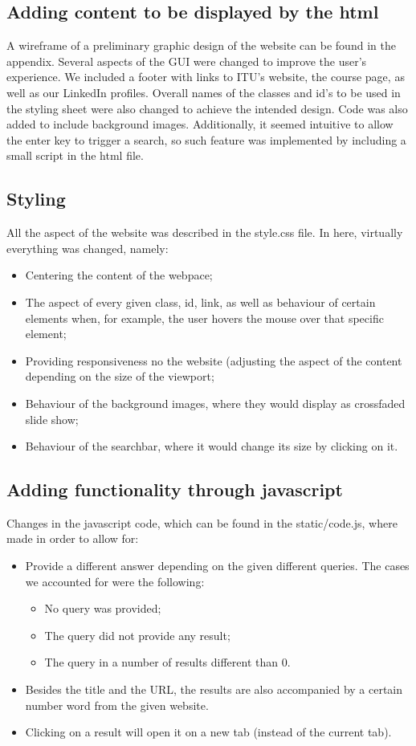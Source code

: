 \subsection{Adding content to be displayed by the html}
A wireframe of a preliminary graphic design of the website can be found in the appendix. Several aspects of the GUI were changed to improve the user's experience. We included a footer with links to ITU's website, the course page, as well as our LinkedIn profiles. Overall names of the classes and id's to be used in the styling sheet were also changed to achieve the intended design. Code was also added to include background images.
Additionally, it seemed intuitive to allow the enter key to trigger a search, so such feature was implemented by including a small script in the html file.

\subsection{Styling}
All the aspect of the website was described in the style.css file. In here, virtually everything was changed, namely:
\begin{itemize}
    \item Centering the content of the webpace;
    \item The aspect of every given class, id, link, as well as behaviour of certain elements when, for example, the user hovers the mouse over that specific element;
    \item Providing responsiveness no the website (adjusting the aspect of the content depending on the size of the viewport;
    \item Behaviour of the background images, where they would display as crossfaded slide show;
    \item Behaviour of the searchbar, where it would change its size by clicking on it.
\end{itemize}

\subsection{Adding functionality through javascript}
Changes in the javascript code, which can be found in the static/code.js, where made in order to allow for:
\begin{itemize}
    \item Provide a different answer depending on the given different queries. The cases we accounted for were the following:
    \begin{itemize}
        \item No query was provided;
        \item The query did not provide any result;
        \item The query in a number of results different than $0$.
    \end{itemize}
    \item Besides the title and the URL, the results are also accompanied by a certain number word from the given website.
    \item Clicking on a result will open it on a new tab (instead of the current tab).
\end{itemize}